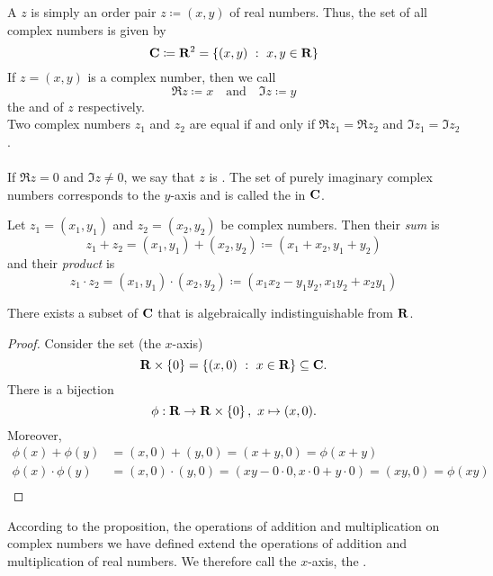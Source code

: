 \begin{definition}
A  $z$ is simply an order pair $z \coloneqq (x,y)$ of real numbers. Thus, the set of all complex numbers is given by
\[\mathbf C \coloneqq \mathbf R^2 = \left\{(x,y)\ :\ x,y\in \mathbf R\right\}\]
If $z = (x,y)$ is a complex number, then we call 
\[\Re z \coloneqq x \quad \text{and} \quad \Im z \coloneqq y\]
the  and  of $z$ respectively.\\[0.5em]
Two complex numbers $z_1$ and $z_2$ are equal if and only if $\Re z_1 = \Re z_2$ and $\Im z_1 = \Im z_2$.\\
\\
If $\Re z = 0$ and $\Im z \neq 0$, we say that $z$ is . The set of purely imaginary complex numbers corresponds to the $y$-axis and is called the  in $\mathbf C$.
\end{definition}


\begin{definition}
Let $z_1 = (x_1,y_1)$ and $z_2 = (x_2,y_2)$ be complex numbers. Then their \emph{sum} is
\[z_1 + z_2 = (x_1,y_1) + (x_2,y_2) \coloneqq (x_1 + x_2,y_1 + y_2)\]
and their \emph{product} is 
\[z_1 \cdot z_2 = (x_1,y_1) \cdot (x_2,y_2) \coloneqq (x_1x_2 - y_1y_2, x_1y_2 + x_2y_1)\]
\end{definition}

\vspace*{1em}

\begin{proposition}
There exists a subset of $\mathbf C$ that is algebraically indistinguishable from $\mathbf R$.
\end{proposition}
\begin{proof}
Consider the set (the $x$-axis)
\[\mathbf R \times \left\{0\right\} = \left\{(x,0)\ :\ x\in \mathbf R\right\} \subseteq \mathbf C.\]
There is a bijection
\[\phi:\mathbf R \to \mathbf R \times \left\{0\right\},\ x \mapsto (x,0).\]
Moreover, 
\begin{align*}
\phi(x) + \phi(y) &= (x,0) + (y,0) = (x+y,0) = \phi(x+y)\\[0.5em]
\phi(x)\cdot\phi(y) &= (x,0)\cdot (y,0) = (xy - 0\cdot 0,x\cdot 0 + y\cdot 0) = (xy,0) = \phi(xy)\\[-2.5em]
\end{align*}
\end{proof}
According to the proposition, the operations of addition and multiplication on complex numbers we have defined extend the operations of addition and multiplication of real numbers. We therefore call the $x$-axis, the .


